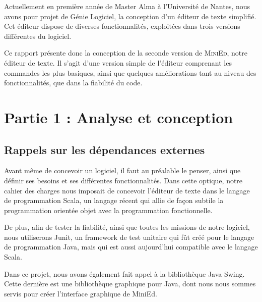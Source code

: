 \documentclass[a4paper, 12pt]{report}
\begin{document}
	\vspace{0.5cm}

	Actuellement en première année de Master Alma à l’Université de Nantes, nous avons pour projet de Génie Logiciel, la conception d’un éditeur de texte simplifié. Cet éditeur dispose de diverses fonctionnalités, exploitées dans trois versions différentes du logiciel.  

	\vspace{0.5cm}

	Ce rapport présente donc la conception de la seconde version de \textsc{MiniEd}, notre éditeur de texte. Il s’agit d’une version simple de l’éditeur comprenant les commandes les plus basiques, ainsi que quelques améliorations tant au niveau des fonctionnalités, que dans la fiabilité du code. 
	
	\newpage
	
	\chapter*{Partie 1 : Analyse et conception}
	
		\section*{Rappels sur les dépendances externes}

		Avant même de concevoir un logiciel, il faut au préalable le penser, ainsi que définir ses besoins et ses différentes fonctionnalités. Dans cette optique, notre cahier des charges nous imposait de concevoir l’éditeur de texte dans le langage de programmation Scala, un langage récent qui allie de façon subtile la programmation orientée objet avec la programmation fonctionnelle. 

		\vspace{0.5cm}

		De plus, afin de tester la fiabilité, ainsi que toutes les missions de notre logiciel, nous utiliserons Junit, un framework de test unitaire qui fût créé pour le langage de programmation Java, mais qui est aussi aujourd’hui compatible avec le langage Scala.

		\vspace{0.5cm}

		Dans ce projet, nous avons également fait appel à la bibliothèque Java Swing. Cette dernière est une bibliothèque graphique pour Java, dont nous nous sommes servis pour créer l’interface graphique de MiniEd.
\end{document}
